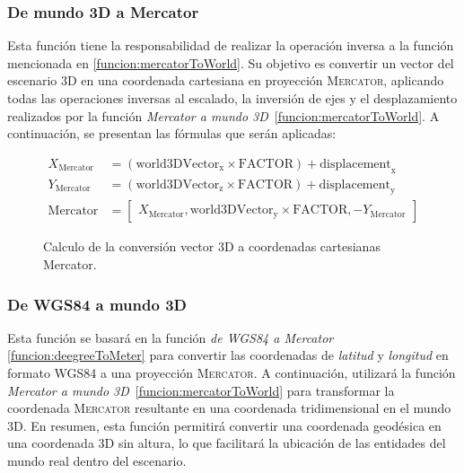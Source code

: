 \documentclass[a4paper, 11pt]{book}
\begin{document}
\subsubsection{De mundo 3D a Mercator}
\label{funcion:worldtoMercator}
Esta función tiene la responsabilidad de realizar la operación inversa a la función mencionada en \ref{funcion:mercatorToWorld}. Su objetivo es convertir un vector del escenario 3D en una coordenada cartesiana en proyección \textsc{Mercator}, aplicando todas las operaciones inversas al escalado, la inversión de ejes y el desplazamiento realizados por la función \emph{Mercator a mundo 3D}~\ref{funcion:mercatorToWorld}. A continuación, se presentan las fórmulas que serán aplicadas:

\begin{figure}[h]
\begin{align*}
X_{\text{Mercator}} &= (\mathbf{\mathrm{world3DVector}}_{\text{x}} \times \mathbf{\mathrm{FACTOR}}) + \mathbf{\mathrm{displacement}}_{\text{x}} \\
Y_{\text{Mercator}} &= (\mathbf{\mathrm{world3DVector}}_{\text{z}} \times \mathbf{\mathrm{FACTOR}}) + \mathbf{\mathrm{displacement}}_{\text{y}} \\
\mathbf{\mathrm{Mercator}} &= 
\begin{bmatrix}
X_{\text{Mercator}}, \mathbf{\mathrm{world3DVector}}_{\text{y}} \times \mathbf{\mathrm{FACTOR}}, -Y_{\text{Mercator}}
\end{bmatrix}
\end{align*}
\caption{Calculo de la conversión vector 3D a coordenadas cartesianas Mercator.}
  \label{formula:worldtoMercator}
\end{figure}

\subsubsection{De WGS84 a mundo 3D}
\label{funcion:degreeToWorld}
Esta función se basará en la función \emph{de WGS84 a Mercator} \ref{funcion:deegreeToMeter} para convertir las coordenadas de \emph{latitud} y \emph{longitud} en formato \textsc{WGS84} a una proyección \textsc{Mercator}. A continuación, utilizará la función \emph{Mercator a mundo 3D}~\ref{funcion:mercatorToWorld} para transformar la coordenada \textsc{Mercator} resultante en una coordenada tridimensional en el mundo \textsc{3D}. En resumen, esta función permitirá convertir una coordenada geodésica en una coordenada \textsc{3D} sin altura, lo que facilitará la ubicación de las entidades del mundo real dentro del escenario.
\end{document}
